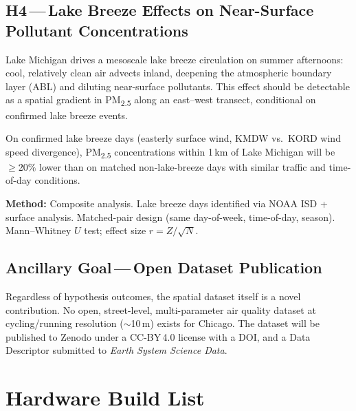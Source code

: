 \documentclass[11pt, letterpaper]{article}
\begin{document}
\subsection{H4\,---\,Lake Breeze Effects on Near-Surface Pollutant Concentrations}

Lake Michigan drives a mesoscale lake breeze circulation on summer afternoons: cool, relatively
clean air advects inland, deepening the atmospheric boundary layer (ABL) and diluting near-surface
pollutants. This effect should be detectable as a spatial gradient in PM\textsubscript{2.5} along
an east--west transect, conditional on confirmed lake breeze events.

\begin{tcolorbox}[callout, title={Testable Hypothesis}]
On confirmed lake breeze days (easterly surface wind, KMDW vs.\ KORD wind speed divergence),
PM\textsubscript{2.5} concentrations within 1\,km of Lake Michigan will be $\geq 20\%$ lower than
on matched non-lake-breeze days with similar traffic and time-of-day conditions.

\medskip
\textbf{Method:} Composite analysis. Lake breeze days identified via NOAA ISD + surface analysis.
Matched-pair design (same day-of-week, time-of-day, season). Mann--Whitney $U$ test;
effect size $r = Z/\sqrt{N}$.
\end{tcolorbox}

\subsection{Ancillary Goal\,---\,Open Dataset Publication}

Regardless of hypothesis outcomes, the spatial dataset itself is a novel contribution. No open,
street-level, multi-parameter air quality dataset at cycling/running resolution ($\sim$10\,m)
exists for Chicago. The dataset will be published to Zenodo under a CC-BY\,4.0 license with a DOI,
and a Data Descriptor submitted to \textit{Earth System Science Data}.

\newpage

\section{Hardware Build List}
\end{document}
